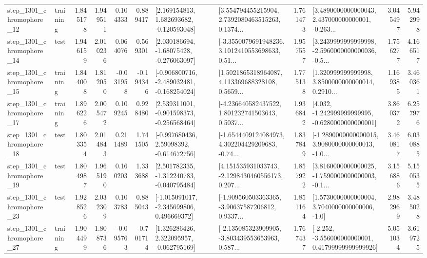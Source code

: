 \begin{tabular}{llrrrrllrlrr}
 step\_1301\_chromophore\_12 &  training &      1.845178 &    1.949511 &      0.104333 &  0.889417 &    [2.169154813, 1.682693682, -0.120593048] &  [3.554794455215904, 2.7392080463515263, 0.1374... &       1.761473 &  [3.4890000000000043, 2.437000000000001, -0.263... &            3.045497 &          5.942998 \\
 step\_1301\_chromophore\_14 &      test &      1.946159 &    2.010236 &      0.064076 &  0.569301 &    [2.030186694, -1.68075428, -0.276063097] &  [-3.3550079691948236, 3.1012410553698633, 0.51... &       1.957557 &  [3.2439999999999998, -2.5960000000000036, -0.5... &            1.756277 &          4.166517 \\
 step\_1301\_chromophore\_15 &  training &      1.844008 &    1.812050 &     -0.031958 & -0.194346 &  [-0.906800716, -2.489032481, -0.168254024] &  [1.5021865318964087, 4.113369688328108, 0.5659... &       1.775138 &  [1.320999999999998, 3.8500000000000014, 0.2910... &            1.169385 &          3.460361 \\
 step\_1301\_chromophore\_17 &  training &      1.896226 &    2.005472 &      0.109245 &  0.928480 &   [2.539311001, -0.901598373, -0.256568464] &  [-4.236640582437522, 1.801232741503643, 0.5037... &       1.936842 &   [4.032, -1.242999999999995, -0.6280000000000001] &            3.860372 &          6.257976 \\
 step\_1301\_chromophore\_18 &      test &      1.803354 &    2.014843 &      0.211489 &  1.741505 &    [-0.997680436, 2.59098392, -0.614672756] &  [-1.6544409124084973, 4.302204429209683, -0.74... &       1.837849 &  [-1.2890000000000015, 3.9080000000000013, -1.0... &            3.460817 &          6.030885 \\
 step\_1301\_chromophore\_19 &      test &      1.804987 &    1.965190 &      0.160203 &  1.333688 &   [2.501782335, -1.312240783, -0.040795484] &  [4.151535931033743, -2.1298430460556173, 0.207... &       1.857922 &  [3.8160000000000025, -1.7590000000000003, -0.1... &            3.156886 &          5.150535 \\
 step\_1301\_chromophore\_23 &      test &      1.928526 &    2.032309 &      0.103783 &  0.885043 &   [-1.015091017, -2.345699806, 0.496669372] &  [-1.909560503363365, -3.90637587206812, 0.9337... &       1.851164 &     [1.5730000000000004, 3.7040000000000006, -1.0] &            2.982969 &          3.485028 \\
 step\_1301\_chromophore\_27 &  training &      1.904499 &    1.808736 &     -0.095763 & -0.701714 &    [1.326286426, 2.322095957, -0.062795169] &  [-2.135085323909905, -3.803439553653963, 0.587... &       1.767437 &  [-2.252, -3.556000000000001, 0.41799999999999926] &            5.051034 &          3.619725 \\

\end{tabular}
